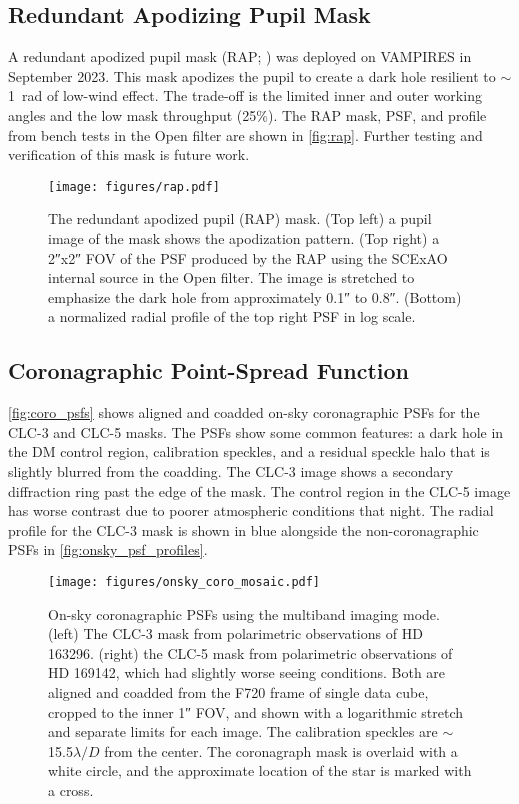 \subsection{Redundant Apodizing Pupil Mask}

A redundant apodized pupil mask (RAP; \citealp{leboulleux_redundant_2022}) was deployed on VAMPIRES in September 2023. This mask apodizes the pupil to create a dark hole resilient to $\sim$\SI{1}{rad} of low-wind effect. The trade-off is the limited inner and outer working angles and the low mask throughput (25\%). The RAP mask, PSF, and profile from bench tests in the Open filter are shown in \autoref{fig:rap}. Further testing and verification of this mask is future work.

\begin{figure}
    \centering
    \texttt{[image: figures/rap.pdf]}
    \caption{The redundant apodized pupil (RAP) mask. (Top left) a pupil image of the mask shows the apodization pattern. (Top right) a \ang{;;2}x\ang{;;2} FOV of the PSF produced by the RAP using the SCExAO internal source in the Open filter. The image is stretched to emphasize the dark hole from approximately \ang{;;0.1} to \ang{;;0.8}. (Bottom) a normalized radial profile of the top right PSF in log scale.\label{fig:rap}}
\end{figure}

\subsection{Coronagraphic Point-Spread Function}

\autoref{fig:coro_psfs} shows aligned and coadded on-sky coronagraphic PSFs for the CLC-3 and CLC-5 masks. The PSFs show some common features: a dark hole in the DM control region, calibration speckles, and a residual speckle halo that is slightly blurred from the coadding. The CLC-3 image shows a secondary diffraction ring past the edge of the mask. The control region in the CLC-5 image has worse contrast due to poorer atmospheric conditions that night. The radial profile for the CLC-3 mask is shown in blue alongside the non-coronagraphic PSFs in \autoref{fig:onsky_psf_profiles}.

\begin{figure}
    \centering
    \texttt{[image: figures/onsky\_coro\_mosaic.pdf]}
    \caption{On-sky coronagraphic PSFs using the multiband imaging mode. (left) The CLC-3 mask from polarimetric observations of HD 163296. (right) the CLC-5 mask from polarimetric observations of HD 169142, which had slightly worse seeing conditions. Both are aligned and coadded from the F720 frame of single data cube, cropped to the inner \ang{;;1} FOV, and shown with a logarithmic stretch and separate limits for each image. The calibration speckles are $\sim$15.5$\lambda/D$ from the center. The coronagraph mask is overlaid with a white circle, and the approximate location of the star is marked with a cross.\label{fig:coro_psfs}}
\end{figure}


